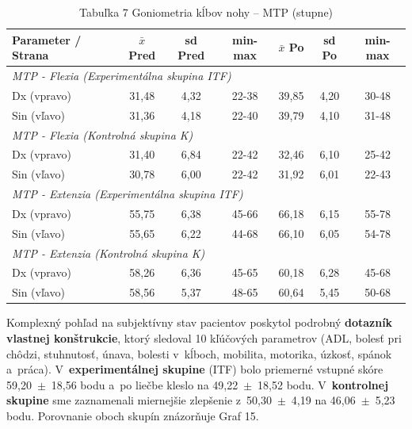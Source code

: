 \begin{table}[H]
\centering
\caption*{Tabuľka 7 Goniometria kĺbov nohy – MTP (stupne)}
\begin{tabular}{|l|c|c|c|c|c|c|}
\hline
\textbf{Parameter / Strana} & \textbf{$\bar{x}$ Pred} & \textbf{sd Pred} & \textbf{min-max} & \textbf{$\bar{x}$ Po} & \textbf{sd Po} & \textbf{min-max} \\ \hline
\multicolumn{7}{|l|}{\textit{MTP - Flexia (Experimentálna skupina ITF)}} \\ \hline
Dx (vpravo) & 31,48 & 4,32 & 22-38 & 39,85 & 4,20 & 30-48 \\ \hline
Sin (vľavo) & 31,36 & 4,18 & 22-40 & 39,79 & 4,10 & 31-48 \\ \hline
\multicolumn{7}{|l|}{\textit{MTP - Flexia (Kontrolná skupina K)}} \\ \hline
Dx (vpravo) & 31,40 & 6,84 & 22-42 & 32,46 & 6,10 & 25-42 \\ \hline
Sin (vľavo) & 30,78 & 6,00 & 22-42 & 31,92 & 6,01 & 22-43 \\ \hline
\multicolumn{7}{|l|}{\textit{MTP - Extenzia (Experimentálna skupina ITF)}} \\ \hline
Dx (vpravo) & 55,75 & 6,38 & 45-66 & 66,18 & 6,15 & 55-78 \\ \hline
Sin (vľavo) & 55,65 & 6,22 & 44-68 & 66,10 & 6,05 & 54-78 \\ \hline
\multicolumn{7}{|l|}{\textit{MTP - Extenzia (Kontrolná skupina K)}} \\ \hline
Dx (vpravo) & 58,26 & 6,36 & 45-65 & 60,18 & 6,28 & 45-68 \\ \hline
Sin (vľavo) & 58,56 & 5,37 & 48-65 & 60,64 & 5,45 & 50-68 \\ \hline
\end{tabular}
\end{table}

Komplexný pohľad na subjektívny stav pacientov poskytol podrobný \textbf{dotazník vlastnej konštrukcie}, ktorý sledoval 10 kľúčových parametrov (ADL, bolesť pri chôdzi, stuhnutosť, únava, bolesti v~kĺboch, mobilita, motorika, úzkosť, spánok a~práca). V~\textbf{experimentálnej skupine} (ITF) bolo priemerné vstupné skóre 59,20~$\pm$~18,56 bodu a~po liečbe kleslo na 49,22~$\pm$~18,52 bodu. V~\textbf{kontrolnej skupine} sme zaznamenali miernejšie zlepšenie z~50,30~$\pm$~4,19 na 46,06~$\pm$~5,23 bodu. Porovnanie oboch skupín znázorňuje Graf 15.

